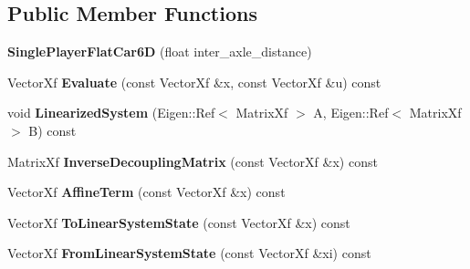 \subsection*{Public Member Functions}
\begin{DoxyCompactItemize}
\item 
{\bfseries Single\+Player\+Flat\+Car6D} (float inter\+\_\+axle\+\_\+distance)\hypertarget{classilqgames_1_1_single_player_flat_car6_d_a9fb4fd8e7be90858f22bc536a7bd3222}{}\label{classilqgames_1_1_single_player_flat_car6_d_a9fb4fd8e7be90858f22bc536a7bd3222}

\item 
Vector\+Xf {\bfseries Evaluate} (const Vector\+Xf \&x, const Vector\+Xf \&u) const \hypertarget{classilqgames_1_1_single_player_flat_car6_d_ab1e6af4ef47c00b30ec12420e9691b52}{}\label{classilqgames_1_1_single_player_flat_car6_d_ab1e6af4ef47c00b30ec12420e9691b52}

\item 
void {\bfseries Linearized\+System} (Eigen\+::\+Ref$<$ Matrix\+Xf $>$ A, Eigen\+::\+Ref$<$ Matrix\+Xf $>$ B) const \hypertarget{classilqgames_1_1_single_player_flat_car6_d_aba8c8306268b96044471aa06d9efeac8}{}\label{classilqgames_1_1_single_player_flat_car6_d_aba8c8306268b96044471aa06d9efeac8}

\item 
Matrix\+Xf {\bfseries Inverse\+Decoupling\+Matrix} (const Vector\+Xf \&x) const \hypertarget{classilqgames_1_1_single_player_flat_car6_d_a236f5a1d6fd3d2d1cb11f4b468efc981}{}\label{classilqgames_1_1_single_player_flat_car6_d_a236f5a1d6fd3d2d1cb11f4b468efc981}

\item 
Vector\+Xf {\bfseries Affine\+Term} (const Vector\+Xf \&x) const \hypertarget{classilqgames_1_1_single_player_flat_car6_d_a662f412d3214b61a99583f2a21647423}{}\label{classilqgames_1_1_single_player_flat_car6_d_a662f412d3214b61a99583f2a21647423}

\item 
Vector\+Xf {\bfseries To\+Linear\+System\+State} (const Vector\+Xf \&x) const \hypertarget{classilqgames_1_1_single_player_flat_car6_d_a514b9407d2e5d7697d366716d11b7d46}{}\label{classilqgames_1_1_single_player_flat_car6_d_a514b9407d2e5d7697d366716d11b7d46}

\item 
Vector\+Xf {\bfseries From\+Linear\+System\+State} (const Vector\+Xf \&xi) const \hypertarget{classilqgames_1_1_single_player_flat_car6_d_a3526acc25cf14c614fdf5b3d8590f269}{}\label{classilqgames_1_1_single_player_flat_car6_d_a3526acc25cf14c614fdf5b3d8590f269}


\end{DoxyCompactItemize}
